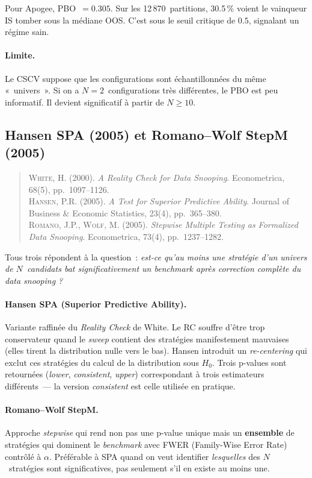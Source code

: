 Pour Apogee, PBO~$= 0.305$. Sur les 12\,870~partitions, 30.5\,\% voient le vainqueur IS tomber sous la médiane OOS. C'est sous le seuil critique de $0.5$, signalant un régime sain.

\paragraph{Limite.} Le CSCV suppose que les configurations sont échantillonnées du même «~univers~». Si on a $N = 2$~configurations très différentes, le PBO est peu informatif. Il devient significatif à partir de $N \geq 10$.

\subsection{Hansen SPA (2005) et Romano--Wolf StepM (2005)}
\label{app:spa_stepm}

\begin{quote}\small
\textsc{White}, H. (2000). \emph{A Reality Check for Data Snooping}. Econometrica, 68(5), pp.~1097--1126.\\
\textsc{Hansen}, P.R. (2005). \emph{A Test for Superior Predictive Ability}. Journal of Business \& Economic Statistics, 23(4), pp.~365--380.\\
\textsc{Romano}, J.P., \textsc{Wolf}, M. (2005). \emph{Stepwise Multiple Testing as Formalized Data Snooping}. Econometrica, 73(4), pp.~1237--1282.
\end{quote}

Tous trois répondent à la question~: \emph{est-ce qu'au moins une stratégie d'un univers de $N$~candidats bat significativement un benchmark après correction complète du data snooping ?}

\paragraph{Hansen SPA (Superior Predictive Ability).} Variante raffinée du \emph{Reality Check} de White. Le RC souffre d'être trop conservateur quand le \emph{sweep} contient des stratégies manifestement mauvaises (elles tirent la distribution nulle vers le bas). Hansen introduit un \emph{re-centering} qui exclut ces stratégies du calcul de la distribution sous $H_{0}$. Trois p-values sont retournées (\emph{lower}, \emph{consistent}, \emph{upper}) correspondant à trois estimateurs différents~--- la version \emph{consistent} est celle utilisée en pratique.

\paragraph{Romano--Wolf StepM.} Approche \emph{stepwise} qui rend non pas une p-value unique mais un \textbf{ensemble} de stratégies qui dominent le \emph{benchmark} avec FWER (Family-Wise Error Rate) contrôlé à $\alpha$. Préférable à SPA quand on veut identifier \emph{lesquelles} des $N$~stratégies sont significatives, pas seulement s'il en existe au moins une.


